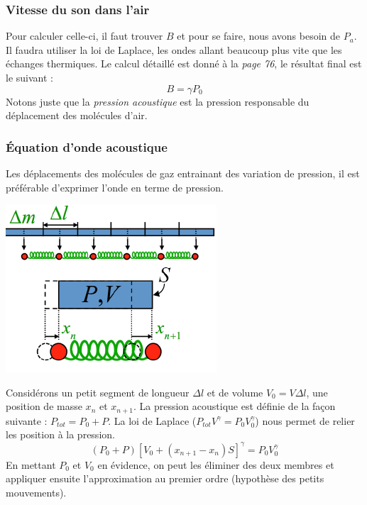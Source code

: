 \documentclass	[11pt, a4paper, openany]{book}
\begin{document}
		\subsubsection{Vitesse du son dans l'air}
		Pour calculer celle-ci, il faut trouver $B$ et pour se faire, nous avons besoin de $P_a$. Il faudra utiliser la loi de Laplace, les ondes allant beaucoup plus vite que les échanges thermiques. Le calcul détaillé est donné à la \textit{page 76}, le résultat final est le suivant :
		\begin{equation}
			B = \gamma P_0
		\end{equation}
		Notons juste que la \textit{pression acoustique} est la pression responsable du déplacement des molécules d'air.
		
		\subsubsection{Équation d'onde acoustique}
		Les déplacements des molécules de gaz entrainant des variation de pression, il est préférable d'exprimer l'onde en terme de pression.
		\begin{center}
			\includegraphics[scale=0.4]{oo/image29.png}
		\end{center}
		Considérons un petit segment de longueur $\Delta l$ et de volume $V_0 = V\Delta l$, une position de masse $x_n$ et $x_{n+1}$.  La pression acoustique est définie de la façon suivante : $P_{tot} = P_0 + P$. La loi de Laplace ($P_{tot}V^\gamma = P_0V_0^\gamma$) nous permet de relier les position à la pression.
		\begin{equation}
			(P_0 + P)\left[V_0 + (x_{n+1} - x_n)S\right]^\gamma = P_0V_0^\gamma
		\end{equation}
		En mettant $P_0$ et $V_0$ en évidence, on peut les éliminer des deux membres et appliquer ensuite l'approximation au premier ordre (hypothèse des petits mouvements).
\end{document}
